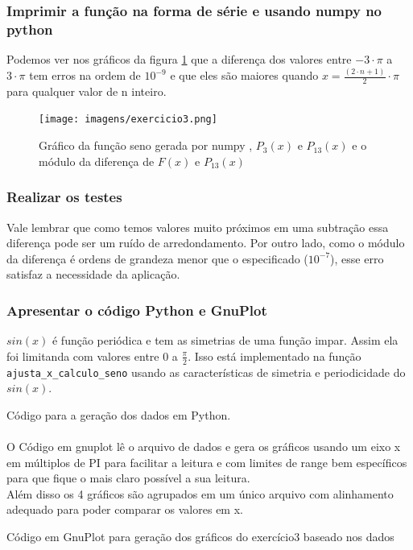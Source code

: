 \subsubsection{Imprimir a função na forma de série e usando numpy no python}

Podemos ver nos gráficos da figura \ref{fig:grafico_exe3} que a diferença dos valores entre $-3 \cdot \pi$ a $3 \cdot \pi$ tem erros na ordem de $10^{-9}$ e que eles são maiores quando $ x = \frac{(2 \cdot n + 1)}{2} \cdot \pi $ para qualquer valor de n inteiro.
\begin{figure}[H]
    \centering
    \texttt{[image: imagens/exercicio3.png]}
    \caption{Gráfico da função seno gerada por numpy , $P_3(x)$ e $P_{13}(x)$ e o módulo da diferença de $F(x)$ e $P_{13}(x)$}
    \label{fig:grafico_exe3}
\end{figure}


\subsubsection{Realizar os testes}



Vale lembrar que como temos valores muito próximos em uma subtração essa diferença pode ser um ruído de arredondamento.
Por outro lado, como o módulo da diferença é ordens de grandeza menor que o especificado ($10^{-7}$), esse erro satisfaz a necessidade da aplicação.\\

\subsubsection{Apresentar o código Python e GnuPlot}
\label{sec:caracteristicas-funcao-sin}
$sin(x)$ é função periódica e tem as simetrias de uma função impar. Assim ela foi limitanda com valores entre $0$ a $\frac{\pi}{2}$.
Isso está implementado na função \texttt{ajusta\_x\_calculo\_seno} usando as características de simetria e periodicidade do $sin(x)$.


Código para a geração dos dados em Python.\\
\\
O Código em gnuplot lê o arquivo de dados e gera os gráficos usando um eixo x em múltiplos de PI para facilitar a leitura e com limites de range bem específicos para que fique o mais claro possível a sua leitura.\\
Além disso os 4 gráficos são agrupados em um único arquivo com alinhamento adequado para poder comparar os valores em x.

Código em GnuPlot para geração dos gráficos do exercício3 baseado nos dados